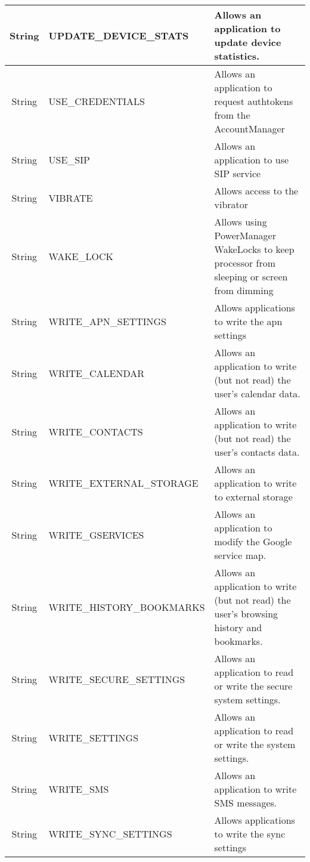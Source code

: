 \begin{longtable}{|c|l|p{8cm}|}
String & UPDATE\_DEVICE\_STATS & Allows an application to update device statistics. \\  \hline 
String & USE\_CREDENTIALS & Allows an application to request authtokens from the AccountManager \\  \hline 
String & USE\_SIP & Allows an application to use SIP service \\  \hline 
String & VIBRATE & Allows access to the vibrator \\  \hline 
String & WAKE\_LOCK & Allows using PowerManager WakeLocks to keep processor from sleeping or screen from dimming \\  \hline 
String & WRITE\_APN\_SETTINGS & Allows applications to write the apn settings \\  \hline 
String & WRITE\_CALENDAR & Allows an application to write (but not read) the user's calendar data. \\  \hline 
String & WRITE\_CONTACTS & Allows an application to write (but not read) the user's contacts data. \\  \hline 
String & WRITE\_EXTERNAL\_STORAGE & Allows an application to write to external storage \\  \hline 
String & WRITE\_GSERVICES & Allows an application to modify the Google service map. \\  \hline 
String & WRITE\_HISTORY\_BOOKMARKS & Allows an application to write (but not read) the user's browsing history and bookmarks. \\  \hline 
String & WRITE\_SECURE\_SETTINGS & Allows an application to read or write the secure system settings. \\  \hline 
String & WRITE\_SETTINGS & Allows an application to read or write the system settings. \\  \hline 
String & WRITE\_SMS & Allows an application to write SMS messages. \\  \hline 
String & WRITE\_SYNC\_SETTINGS & Allows applications to write the sync settings \\ 
\hline
  \end{longtable}

\restoregeometry
